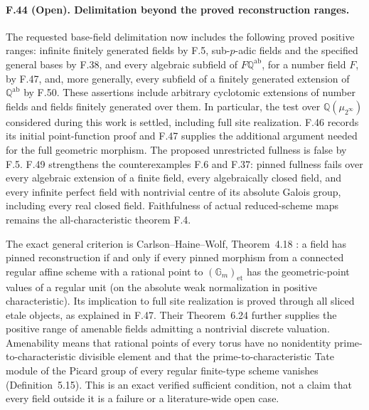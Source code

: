 \paragraph{F.44 (Open). Delimitation beyond the proved reconstruction ranges.}
The requested base-field delimitation now includes the following
proved positive ranges: infinite finitely generated fields by F.5,
sub-$p$-adic fields and the specified general bases by F.38, and
every algebraic subfield of $F\mathbb Q^{\mathrm{ab}}$, for a
number field $F$, by F.47, and, more generally, every subfield of
a finitely generated extension of $\mathbb Q^{\mathrm{ab}}$ by
F.50. These assertions include arbitrary cyclotomic extensions of
number fields and fields finitely generated over them. In particular, the test
over $\mathbb Q(\mu_{2^\infty})$ considered during this work is
settled, including full site realization. F.46 records its initial
point-function proof and F.47 supplies the additional argument
needed for the full geometric morphism. The proposed unrestricted
fullness is false by F.5. F.49 strengthens the counterexamples
F.6 and F.37: pinned fullness fails over every algebraic extension
of a finite field, every algebraically closed field, and every
infinite perfect field with nontrivial centre of its absolute
Galois group, including every real closed field.
Faithfulness of actual reduced-scheme maps remains
the all-characteristic theorem F.4.

The exact general criterion is Carlson--Haine--Wolf,
Theorem~4.18 \cite{CHW2024}: a field has pinned reconstruction if
and only if every pinned morphism from a connected regular affine
scheme with a rational point to $(\mathbb G_m)_{\mathrm{et}}$
has the geometric-point values of a regular unit (on the absolute
weak normalization in positive characteristic). Its implication to
full site realization is proved through all sliced etale objects,
as explained in F.47. Their Theorem~6.24 further supplies the
positive range of amenable fields admitting a nontrivial discrete
valuation. Amenability means that rational points of every torus
have no nonidentity prime-to-characteristic divisible element and
that the prime-to-characteristic Tate module of the Picard group of
every regular finite-type scheme vanishes (Definition~5.15).
This is an exact verified sufficient condition, not a claim that
every field outside it is a failure or a literature-wide open case.

